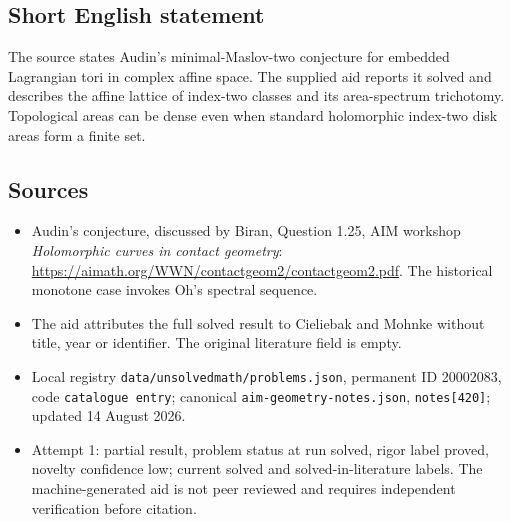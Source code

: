 \documentclass[11pt]{article}
\begin{document}
\subsection{Short English statement}
The source states Audin's minimal-Maslov-two conjecture for embedded Lagrangian tori in complex affine space. The supplied aid reports it solved and describes the affine lattice of index-two classes and its area-spectrum trichotomy. Topological areas can be dense even when standard holomorphic index-two disk areas form a finite set.
\subsection{Sources}
\begin{itemize}
\item Audin's conjecture, discussed by Biran, Question 1.25, AIM workshop \emph{Holomorphic curves in contact geometry}: \url{https://aimath.org/WWN/contactgeom2/contactgeom2.pdf}. The historical monotone case invokes Oh's spectral sequence.
\item The aid attributes the full solved result to Cieliebak and Mohnke without title, year or identifier. The original literature field is empty.
\item Local registry \texttt{data/unsolvedmath/problems.json}, permanent ID 20002083, code \texttt{catalogue entry}; canonical \texttt{aim-geometry-notes.json}, \texttt{notes[420]}; updated 14 August 2026.
\item Attempt 1: partial result, problem status at run solved, rigor label proved, novelty confidence low; current solved and solved-in-literature labels. The machine-generated aid is not peer reviewed and requires independent verification before citation.
\end{itemize}
\end{document}
